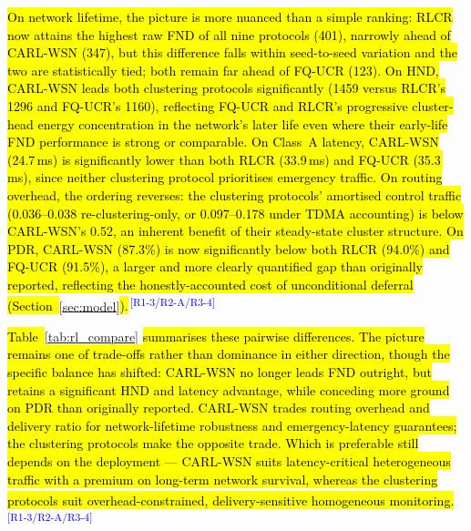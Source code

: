 \documentclass[12pt]{article}
\newcommand{\rtag}[1]{\textsuperscript{\textcolor{blue}{\scriptsize\,[#1]}}}
\newcommand{\hlx}[1]{{\exhyphenpenalty=10000\hyphenpenalty=10000\let\ \nobreakspace\hl{#1}}}
\begin{document}
\hlx{On network lifetime, the picture is more nuanced than a simple
ranking: RLCR now attains the highest raw FND of all nine protocols
(401), narrowly ahead of CARL-WSN (347), but this difference falls
within seed-to-seed variation and the two are statistically tied;
both remain far ahead of FQ-UCR (123). On HND, CARL-WSN leads both
clustering protocols significantly (1459 versus RLCR's 1296 and
FQ-UCR's 1160), reflecting FQ-UCR and RLCR's progressive
cluster-head energy concentration in the network's later life even
where their early-life FND performance is strong or comparable. On
Class~A latency, CARL-WSN (24.7\,ms) is significantly lower than
both RLCR (33.9\,ms) and FQ-UCR (35.3\,ms), since neither clustering
protocol prioritises emergency traffic. On routing overhead, the
ordering reverses: the clustering protocols' amortised control
traffic (0.036--0.038 re-clustering-only, or 0.097--0.178 under
TDMA accounting) is below CARL-WSN's 0.52, an
inherent benefit of their steady-state cluster structure. On PDR,
CARL-WSN (87.3\%) is now significantly below both RLCR (94.0\%) and
FQ-UCR (91.5\%), a larger and more clearly quantified gap than
originally reported, reflecting the honestly-accounted cost of
unconditional deferral (Section~}\ref{sec:model}\hlx{).}\rtag{R1-3/R2-A/R3-4}

\hlx{Table~}\ref{tab:rl_compare}\hlx{ summarises these pairwise differences.
The picture remains one of trade-offs rather than dominance in
either direction, though the specific balance has shifted: CARL-WSN
no longer leads FND outright, but retains a significant HND and
latency advantage, while conceding more ground on PDR than
originally reported. CARL-WSN trades routing overhead and delivery
ratio for network-lifetime robustness and emergency-latency
guarantees; the clustering protocols make the opposite trade. Which
is preferable still depends on the deployment --- CARL-WSN suits
latency-critical heterogeneous traffic with a premium on long-term
network survival, whereas the clustering protocols suit
overhead-constrained, delivery-sensitive homogeneous monitoring.}\rtag{R1-3/R2-A/R3-4}
\end{document}
